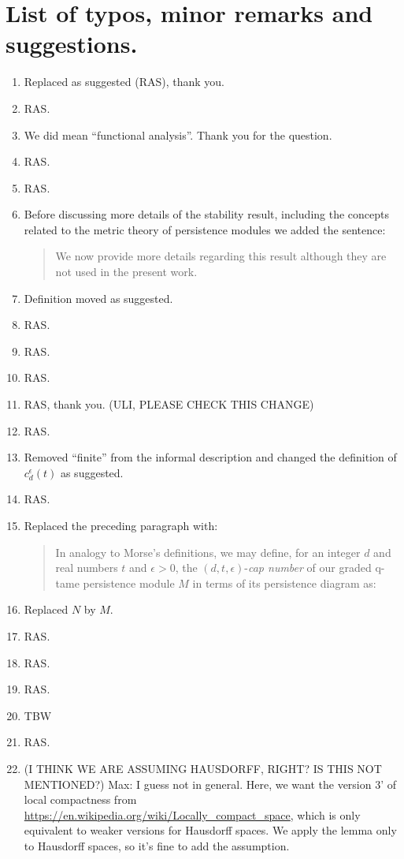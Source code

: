 \documentclass{article}
\begin{document}
	\section{List of typos, minor remarks and suggestions.}
	\begin{enumerate}
		\item Replaced as suggested (RAS), thank you.
		\item RAS.
		\item We did mean ``functional analysis''. Thank you for the question.
		\item RAS.
		\item RAS.
		\item Before discussing more details of the stability result, including the concepts related to the metric theory of persistence modules we added the sentence:
		\begin{quote}
			We now provide more details regarding this result although they are not used in the present work.
		\end{quote}
		\item Definition moved as suggested.
		\item RAS.
		\item RAS.
		\item RAS.
		\item RAS, thank you. (ULI, PLEASE CHECK THIS CHANGE)
		\item RAS.
		\item Removed ``finite'' from the informal description and changed the definition of $c_d^{\epsilon}(t)$ as suggested.
		\item RAS.
		\item Replaced the preceding paragraph with:
		\begin{quote}
			In analogy to Morse's definitions, we may define, for an integer $d$ and real numbers $t$ and $\epsilon > 0$, the $(d, t, \epsilon)$-\emph{cap number} of our graded q-tame persistence module $M$ in terms of its persistence diagram as:
		\end{quote}
		\item Replaced $N$ by $M$.
		\item RAS.
		\item RAS.
		\item RAS.
		\item TBW
		\item RAS.
		\item (I THINK WE ARE ASSUMING HAUSDORFF, RIGHT? IS THIS NOT MENTIONED?)
		Max: I guess not in general. Here, we want the version 3' of local compactness from \url{https://en.wikipedia.org/wiki/Locally_compact_space}, which is only equivalent to weaker versions for Hausdorff spaces. We apply the lemma only to Hausdorff spaces, so it's fine to add the assumption.


\end{enumerate}
\end{document}
